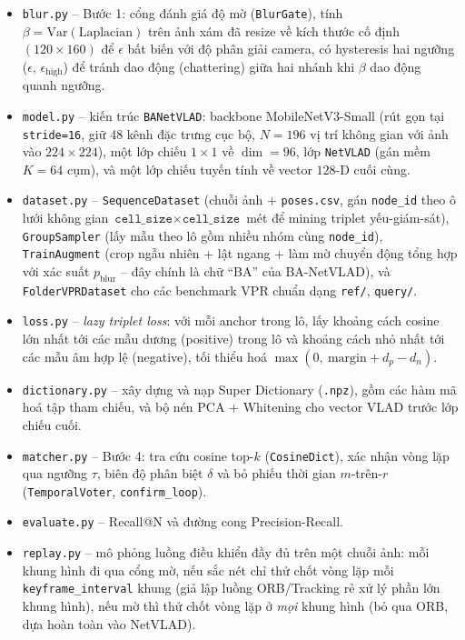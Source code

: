\documentclass[a4paper,12pt]{article}
\begin{document}
\begin{itemize}
    \item \texttt{blur.py} -- Bước 1: cổng đánh giá độ mờ (\texttt{BlurGate}), tính $\beta = \mathrm{Var}(\mathrm{Laplacian})$ trên ảnh xám đã resize về kích thước cố định $(120\times160)$ để $\epsilon$ bất biến với độ phân giải camera, có hysteresis hai ngưỡng ($\epsilon$, $\epsilon_{\text{high}}$) để tránh dao động (chattering) giữa hai nhánh khi $\beta$ dao động quanh ngưỡng.
    \item \texttt{model.py} -- kiến trúc \texttt{BANetVLAD}: backbone MobileNetV3-Small (rút gọn tại \texttt{stride=16}, giữ 48 kênh đặc trưng cục bộ, $N=196$ vị trí không gian với ảnh vào $224\times224$), một lớp chiếu $1\times1$ về $\dim=96$, lớp \texttt{NetVLAD} (gán mềm $K=64$ cụm), và một lớp chiếu tuyến tính về vector $128$-D cuối cùng.
    \item \texttt{dataset.py} -- \texttt{SequenceDataset} (chuỗi ảnh + \texttt{poses.csv}, gán \texttt{node\_id} theo ô lưới không gian $\texttt{cell\_size}\times\texttt{cell\_size}$ mét để mining triplet yếu-giám-sát), \texttt{GroupSampler} (lấy mẫu theo lô gồm nhiều nhóm cùng \texttt{node\_id}), \texttt{TrainAugment} (crop ngẫu nhiên + lật ngang + làm mờ chuyển động tổng hợp với xác suất $p_{\text{blur}}$ -- đây chính là chữ ``BA'' của BA-NetVLAD), và \texttt{FolderVPRDataset} cho các benchmark VPR chuẩn dạng \texttt{ref/}, \texttt{query/}.
    \item \texttt{loss.py} -- \emph{lazy triplet loss}: với mỗi anchor trong lô, lấy khoảng cách cosine lớn nhất tới các mẫu dương (positive) trong lô và khoảng cách nhỏ nhất tới các mẫu âm hợp lệ (negative), tối thiểu hoá $\max(0,\ \text{margin} + d_p - d_n)$.
    \item \texttt{dictionary.py} -- xây dựng và nạp Super Dictionary (\texttt{.npz}), gồm các hàm mã hoá tập tham chiếu, và bộ nén PCA + Whitening cho vector VLAD trước lớp chiếu cuối.
    \item \texttt{matcher.py} -- Bước 4: tra cứu cosine top-$k$ (\texttt{CosineDict}), xác nhận vòng lặp qua ngưỡng $\tau$, biên độ phân biệt $\delta$ và bỏ phiếu thời gian $m$-trên-$r$ (\texttt{TemporalVoter}, \texttt{confirm\_loop}).
    \item \texttt{evaluate.py} -- Recall@N và đường cong Precision-Recall.
    \item \texttt{replay.py} -- mô phỏng luồng điều khiển đầy đủ trên một chuỗi ảnh: mỗi khung hình đi qua cổng mờ, nếu sắc nét chỉ thử chốt vòng lặp mỗi \texttt{keyframe\_interval} khung (giả lập luồng ORB/Tracking rẻ xử lý phần lớn khung hình), nếu mờ thì thử chốt vòng lặp ở \emph{mọi} khung hình (bỏ qua ORB, dựa hoàn toàn vào NetVLAD).
\end{itemize}
\end{document}
